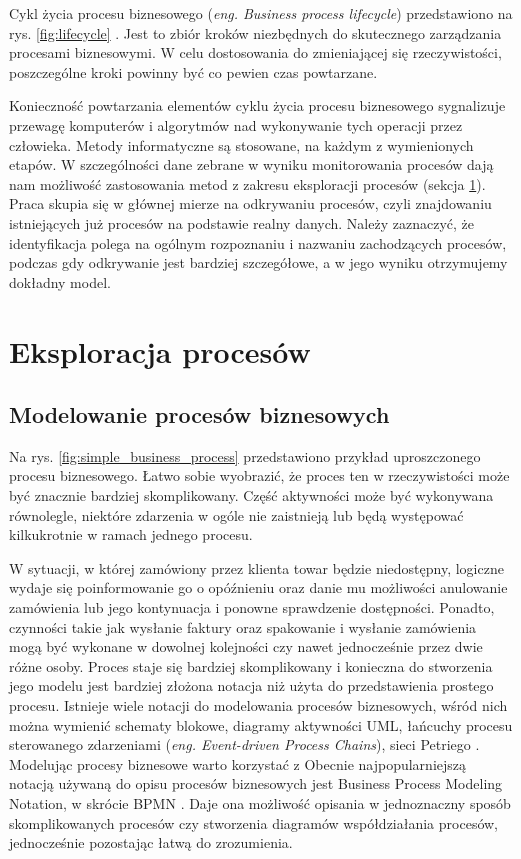 Cykl życia procesu biznesowego (\textit{eng. Business process lifecycle}) przedstawiono na rys. \ref{fig:lifecycle} \cite{dumas2013fundamentals}. Jest to zbiór kroków niezbędnych do skutecznego zarządzania procesami biznesowymi. W celu dostosowania do zmieniającej się rzeczywistości, poszczególne kroki powinny być co pewien czas powtarzane. 

Konieczność powtarzania elementów cyklu życia procesu biznesowego sygnalizuje przewagę komputerów i algorytmów    nad wykonywanie tych operacji przez człowieka. Metody informatyczne są stosowane, na każdym z wymienionych etapów. W szczególności dane zebrane w wyniku monitorowania procesów dają nam możliwość zastosowania metod z zakresu eksploracji procesów (sekcja \ref{sec:eksploracja}). Praca skupia się w głównej mierze na odkrywaniu procesów, czyli znajdowaniu istniejących już procesów na podstawie realny danych. Należy zaznaczyć, że identyfikacja polega na ogólnym rozpoznaniu i nazwaniu zachodzących procesów, podczas gdy odkrywanie jest bardziej szczegółowe, a w jego wyniku otrzymujemy dokładny model.  


\section{Eksploracja procesów}
\label{sec:eksploracja}
\subsection{Modelowanie procesów biznesowych}
Na rys. \ref{fig:simple_business_process} przedstawiono przykład uproszczonego procesu biznesowego. Łatwo sobie wyobrazić, że proces ten w rzeczywistości może być znacznie bardziej skomplikowany. Część aktywności może być wykonywana równolegle, niektóre zdarzenia w ogóle nie zaistnieją lub będą występować kilkukrotnie w ramach jednego procesu. 


W sytuacji, w której zamówiony przez klienta towar będzie niedostępny, logiczne wydaje się poinformowanie go o opóźnieniu oraz danie mu możliwości anulowanie zamówienia lub jego kontynuacja i ponowne sprawdzenie dostępności. Ponadto, czynności takie jak wysłanie faktury oraz spakowanie i wysłanie zamówienia mogą być wykonane w dowolnej kolejności czy nawet jednocześnie przez dwie różne osoby. Proces staje się bardziej skomplikowany i konieczna do stworzenia jego modelu jest bardziej złożona notacja niż użyta do przedstawienia prostego procesu. 
Istnieje wiele notacji do modelowania procesów biznesowych, wśród nich można wymienić schematy blokowe, diagramy aktywności UML, łańcuchy procesu sterowanego zdarzeniami (\textit{eng. Event-driven Process Chains}), sieci Petriego \cite{BPMComparission}. Modelując procesy biznesowe warto korzystać z 
Obecnie najpopularniejszą notacją używaną do opisu procesów biznesowych jest Business Process Modeling Notation, w skrócie BPMN \cite{omg2011bpmn}. Daje ona możliwość opisania w jednoznaczny sposób skomplikowanych procesów czy stworzenia diagramów współdziałania procesów, jednocześnie pozostając łatwą do zrozumienia.

